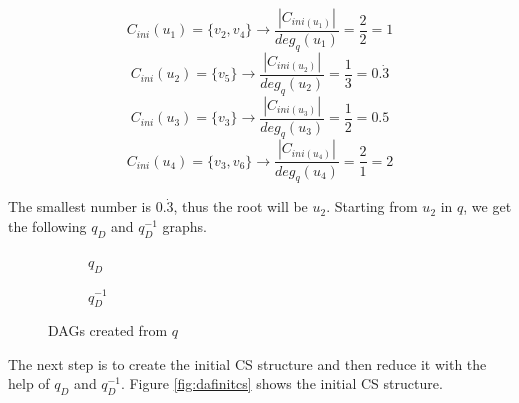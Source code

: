 \begin{example}
    \[
        C_{ini}(u_1) = \{v_2, v_4\} \rightarrow \frac{|C_{ini(u_1)}|}{deg_q(u_1)} = \frac{2}{2} = 1
    \]
    \[
        C_{ini}(u_2) = \{v_5\} \rightarrow \frac{|C_{ini(u_2)}|}{deg_q(u_2)} = \frac{1}{3} = 0.\dot{3}
    \]
    \[
        C_{ini}(u_3) = \{v_3\} \rightarrow \frac{|C_{ini(u_3)}|}{deg_q(u_3)} = \frac{1}{2} = 0.5
    \]
    \[
        C_{ini}(u_4) = \{v_3,v_6\} \rightarrow \frac{|C_{ini(u_4)}|}{deg_q(u_4)} = \frac{2}{1} = 2
    \]

    The smallest number is $0.\dot{3}$, thus the root will be $u_2$. Starting from $u_2$ in $q$, we get
    the following $q_D$ and $q^{-1}_D$ graphs.

    \begin{figure}[h!]
        \centering
        \begin{subfigure}{.4\textwidth}
            \centering
          \caption{$q_D$}
        \end{subfigure}
        \begin{subfigure}{.4\textwidth}
            \centering
          \caption{$q^{-1}_D$}
        \end{subfigure}      
        \caption{DAGs created from $q$}  
        \label{fig:dafqd}
    \end{figure}

    The next step is to create the initial CS structure and then reduce it with the help of $q_D$ and $q^{-1}_D$.
    Figure \ref{fig:dafinitcs} shows the initial CS structure.


\end{example}

